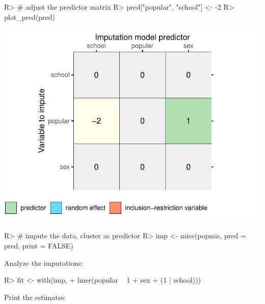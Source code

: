 \documentclass[
]{jss}
\begin{document}
\begin{CodeChunk}
\begin{CodeInput}
R> # adjust the predictor matrix
R> pred["popular", "school"] <- -2 
R> plot_pred(pred)
\end{CodeInput}


\begin{center}\includegraphics{Imputation_of_Incomplete_Multilevel_Data_files/figure-latex/pop_multilevel-1} \end{center}

\begin{CodeInput}
R> # impute the data, cluster as predictor
R> imp <- mice(popmis, pred = pred, print = FALSE)
\end{CodeInput}
\end{CodeChunk}

Analyze the imputations:

\begin{CodeChunk}
\begin{CodeInput}
R> fit <- with(imp, 
+             lmer(popular ~ 1 + sex + (1 | school))) 
\end{CodeInput}
\end{CodeChunk}

Print the estimates:
\end{document}
